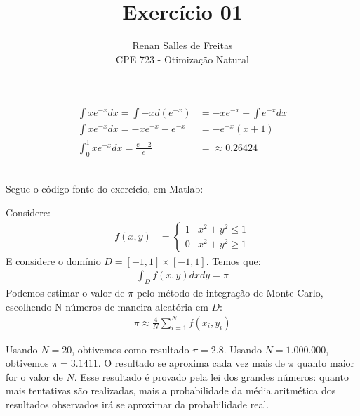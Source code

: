 \documentclass[12pt]{article}
\newenvironment{exercise}[2][Exercício]{\begin{trivlist}
\item[\hskip \labelsep {\bfseries #1}\hskip \labelsep {\bfseries #2.}]}{\end{trivlist}}
\begin{document}
 
 
\title{Exercício 01}
\author{Renan Salles de Freitas\\
CPE 723 - Otimização Natural}
 
\maketitle
 
\begin{exercise}{1.a} 
\begin{align*}
\int xe^{-x} dx = \int -x d(e^{-x}) &= -xe^{-x} + \int e^{-x} dx \\
\int xe^{-x} dx = -xe^{-x} - e^{-x} &= -e^{-x} (x+1)  \\
\int_{0}^{1} xe^{-x} dx = \frac{e-2}{e} &= \approx 0.26424
\end{align*}
\end{exercise}
 
\begin{exercise}{1.b}\\
Segue o código fonte do exercício, em Matlab:
 
\end{exercise}

\begin{exercise}{2}
Considere:
\begin{align*}
f(x,y) &= \begin{cases}
1 & x^2 + y^2 \leq 1\\
0 & x^2 + y^2 \geq 1
\end{cases}
\end{align*}
E considere o domínio $D = [-1,1] \times [-1,1]$. Temos que:
\begin{align*}
\int_D f(x,y)dxdy = \pi
\end{align*}
Podemos estimar o valor de $\pi$ pelo método de integração de Monte Carlo,
escolhendo N números de maneira aleatória em $D$:
\begin{align*}
\pi \approx \frac{4}{N}\sum_{i=1}^{N}f(x_i,y_i)
\end{align*}

Usando $N=20$, obtivemos como resultado $\pi = 2.8$. Usando $N=1.000.000$,
obtivemos $\pi = 3.1411$. O resultado se aproxima cada vez mais de $\pi$ quanto
maior for o valor de $N$. Esse resultado é provado pela lei dos grandes números:
quanto mais tentativas são realizadas, mais a probabilidade da média aritmética
dos resultados observados irá se aproximar da probabilidade real.

 
\end{exercise}
\end{document}
